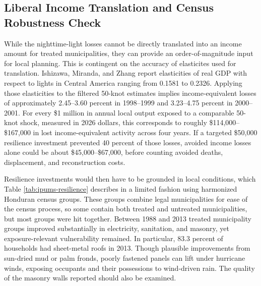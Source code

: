 \documentclass[12pt]{article}
\begin{document}
\subsection{Liberal Income Translation and Census Robustness Check}

While the nighttime-light losses cannot be directly translated into an income amount for treated municipalities, they can provide an order-of-magnitude input for local planning. This is contingent on the accuracy of elasticites used for translation. Ishizawa, Miranda, and Zhang report elasticities of real GDP with respect to lights in Central America ranging from 0.1581 to 0.2326. Applying those elasticities to the filtered 50-knot estimates implies income-equivalent losses of approximately 2.45--3.60 percent in 1998--1999 and 3.23--4.75 percent in 2000--2001. For every \$1 million in annual local output exposed to a comparable 50-knot shock, measured in 2026 dollars, this corresponds to roughly \$114,000--\$167,000 in lost income-equivalent activity across four years. If a targeted \$50,000 resilience investment prevented 40 percent of those losses, avoided income losses alone could be about \$45,000--\$67,000, before counting avoided deaths, displacement, and reconstruction costs.

Resilience investments would then have to be grounded in local conditions, which Table \ref{tab:ipums-resilience} describes
in a limited fashion using harmonized Honduran census groups. These groups combine legal municipalities for ease of the census process, so some contain both treated and untreated municipalities, but most groups were hit together. Between 1988 and 2013 treated municipality groups improved substantially in electricity, sanitation, and masonry, yet exposure-relevant vulnerability remained. In particular, 83.3 percent of households had sheet-metal roofs in 2013. Though plausible improvements from sun-dried mud or palm fronds, poorly fastened panels can lift under hurricane winds, exposing occupants and their possessions to wind-driven rain. The quality of the masonry walls reported should also be examined.
\end{document}
